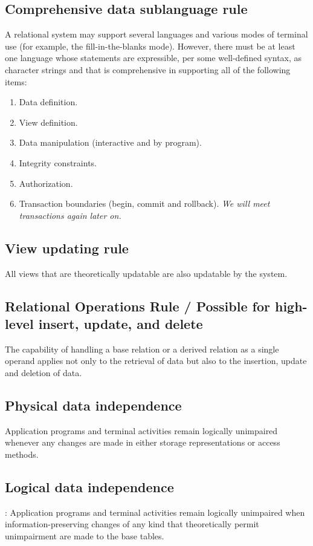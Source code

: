 \subsection{Comprehensive data sublanguage rule}
  A relational system may support several languages and various modes of terminal use (for example, the fill-in-the-blanks mode). However, there must be at least one language whose statements are expressible, per some well-defined syntax, as character strings and that is comprehensive in supporting all of the following items:
  \begin{enumerate}
  \item Data definition.
  \item View definition.
  \item Data manipulation (interactive and by program).
  \item Integrity constraints.
  \item Authorization.
  \item Transaction boundaries (begin, commit and rollback). \textit{We will meet transactions again later on.}
  \end{enumerate}

\subsection{View updating rule}
  All views that are theoretically updatable are also updatable by the system.

\subsection{Relational Operations Rule / Possible for high-level insert, update, and delete}
  The capability of handling a base relation or a derived relation as a single operand applies not only to the retrieval of data but also to the insertion, update and deletion of data.

\subsection{Physical data independence}
  Application programs and terminal activities remain logically unimpaired whenever any changes are made in either storage representations or access methods.

\subsection{Logical data independence}:
  Application programs and terminal activities remain logically unimpaired when information-preserving changes of any kind that theoretically permit unimpairment are made to the base tables.

